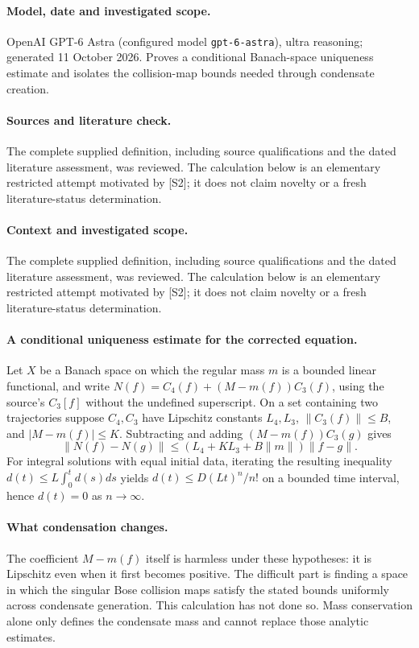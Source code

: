 \documentclass[11pt]{article}
\begin{document}
\paragraph{Model, date and investigated scope.}
OpenAI GPT-6 Astra (configured model \texttt{gpt-6-astra}), ultra reasoning; generated 11 October 2026. Proves a conditional Banach-space uniqueness estimate and isolates the collision-map bounds needed through condensate creation.

\paragraph{Sources and literature check.}
The complete supplied definition, including source qualifications and the dated literature assessment, was reviewed. The calculation below is an elementary restricted attempt motivated by [S2]; it does not claim novelty or a fresh literature-status determination.

\paragraph{Context and investigated scope.} The complete supplied definition, including source qualifications and the dated literature assessment, was reviewed. The calculation below is an elementary restricted attempt motivated by [S2]; it does not claim novelty or a fresh literature-status determination.

\paragraph{A conditional uniqueness estimate for the corrected equation.} Let $X$ be a Banach space on which the regular mass $m$ is a bounded linear functional, and write $N(f)=C_4(f)+(M-m(f))C_3(f)$, using the source's $C_3[f]$ without the undefined superscript. On a set containing two trajectories suppose $C_4,C_3$ have Lipschitz constants $L_4,L_3$, $\|C_3(f)\|\leq B$, and $|M-m(f)|\leq K$. Subtracting and adding $(M-m(f))C_3(g)$ gives
\[
 \|N(f)-N(g)\|\leq(L_4+KL_3+B\|m\|)\|f-g\|.
\]
For integral solutions with equal initial data, iterating the resulting inequality $d(t)\leq L\int_0^td(s)ds$ yields $d(t)\leq D(Lt)^n/n!$ on a bounded time interval, hence $d(t)=0$ as $n\to\infty$.

\paragraph{What condensation changes.} The coefficient $M-m(f)$ itself is harmless under these hypotheses: it is Lipschitz even when it first becomes positive. The difficult part is finding a space in which the singular Bose collision maps satisfy the stated bounds uniformly across condensate generation. This calculation has not done so. Mass conservation alone only defines the condensate mass and cannot replace those analytic estimates.
\end{document}
